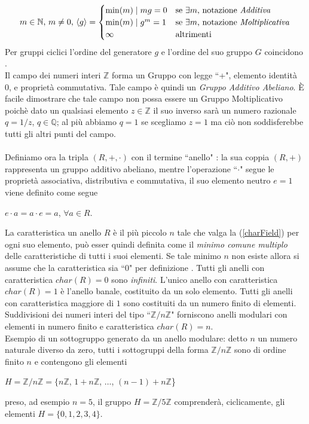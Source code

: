 \documentclass[a4paper,12pt]{tesiinfo}
\begin{document}
\begin{gather}
m \in \mathbb{N}\text{, }m \ne 0 \text{, }\langle g \rangle = 
\begin{cases} 
\min (m) \mid mg = 0 & \mbox{se }\exists m \text{, notazione \textit{Additiva}}\\
\min (m) \mid g^m = 1 & \mbox{se }\exists m \text{, notazione \textit{Moltiplicativa}}\\
\infty & \mbox{altrimenti}\\
\end{cases}
\label{ordineGeneratoreGruppo}
\end{gather}
Per gruppi ciclici l'ordine del generatore $g$ e l'ordine del suo gruppo $G$ coincidono \cite{char_Ring}.
\\
Il campo dei numeri interi $\mathbb{Z}$ forma un Gruppo con legge ``+", elemento identit\`a 0, e propriet\`a commutativa. Tale campo \`e quindi un \textit{Gruppo Additivo Abeliano}. \`E facile dimostrare che tale campo non possa essere un Gruppo Moltiplicativo poich\`e dato un qualsiasi elemento $z \in \mathbb{Z}$ il suo inverso sar\`a un numero razionale $q = 1 / z$, $q \in \mathbb{Q}$; al pi\`u abbiamo $q=1$ se scegliamo $z=1$ ma ci\`o non soddisferebbe tutti gli altri punti del campo.
\\
\\
Definiamo ora la tripla $(R, +, \cdot)$ con il termine ``anello" \cite{anelli1}: la sua coppia $(R, +)$ rappresenta un gruppo additivo abeliano, mentre l'operazione ``$\cdot$" segue le propriet\`a associativa, distributiva e commutativa, il suo elemento neutro $e=1$ viene definito come segue
\begin{center}
 $e\cdot a = a\cdot e = a$, $\forall a \in R$.%
\end{center}
%
%
%
La caratteristica un anello $R$ \`e il pi\`u piccolo $n$ tale che valga la (\ref{charField}) per ogni suo elemento, pu\`o esser quindi definita come il \textit{minimo comune multiplo} delle caratteristiche di tutti i suoi elementi. Se tale minimo $n$ non esiste allora si assume che la caratteristica sia ``0" per definizione \cite{char_Ring}. Tutti gli anelli con caratteristica $char(R)=0$ sono \textit{infiniti}. 
L'unico anello con caratteristica $char(R)=1$ \`e l'anello banale, costituito da un solo elemento. 
Tutti gli anelli con caratteristica maggiore di $1$ sono costituiti da un numero finito di elementi. Suddivisioni dei numeri interi del tipo ``$\mathbb{Z}/n\mathbb{Z}$" forniscono anelli modulari con elementi in numero finito e caratteristica $char(R) = n$.
\\
Esempio di un sottogruppo generato da un anello modulare: detto $n$ un numero naturale diverso da zero, tutti i sottogruppi della forma $\mathbb{Z}/n\mathbb{Z}$ sono di ordine finito $n$ e contengono gli elementi
\begin{center}
 $H=\mathbb{Z}/n\mathbb{Z}=\{n\mathbb{Z}$, $ 1+n\mathbb{Z}$, $\ldots $, $(n-1)+n\mathbb{Z}$\}
 \\
\end{center}
preso, ad esempio $n=5$, il gruppo $H = \mathbb{Z}/5\mathbb{Z}$ comprender\`a, ciclicamente, gli elementi $H= \{0, 1, 2, 3, 4\}$.
%
%
%
\end{document}
